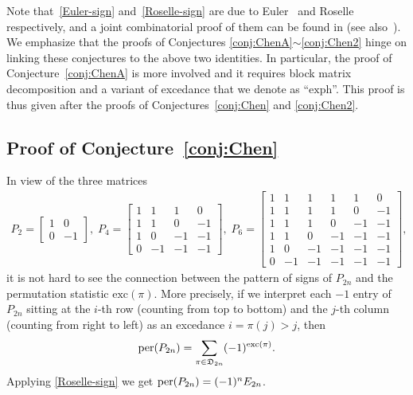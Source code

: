 \documentclass[11pt,reqno]{amsart}
\numberwithin{equation}{section}
\theoremstyle{plain}
\theoremstyle{definition}
\def\exc{\mathrm{exc}}
\def\per{\mathrm{per}}
\def\exph{\mathrm{exph}}
\newcommand{\D}{\mathfrak{D}}
\def\per{{\rm per}}
\begin{document}
Note that~\eqref{Euler-sign} and~\eqref{Roselle-sign} are due to Euler~\cite{Eul} and Roselle~\cite{Ros} respectively, and a joint combinatorial proof of them can be found in \cite[Chap.~5]{FS} (see also~\cite{LZ}). We emphasize that the proofs of Conjectures \ref{conj:ChenA}\texorpdfstring{$\sim$}{}\ref{conj:Chen2} hinge on linking these conjectures to the above two identities. In particular, the proof of Conjecture~\ref{conj:ChenA} is more involved and it requires block matrix decomposition and a variant of excedance that we denote as ``$\exph$''. This proof is thus given after the proofs of Conjectures~\ref{conj:Chen} and \ref{conj:Chen2}.

\subsection{Proof of Conjecture~\ref{conj:Chen}}

In view of the three matrices
\begin{align*}
P_2=\begin{bmatrix}
1 & 0 \\
0 & -1
\end{bmatrix},
\;
P_4=\begin{bmatrix}
1 & 1 & 1 & 0\\
1 & 1 & 0 & -1\\
1 & 0 & -1 & -1\\
0 & -1 & -1 & -1
\end{bmatrix},
\;
P_6=\begin{bmatrix}
1 & 1 & 1 & 1 & 1 & 0\\
1 & 1 & 1 & 1 & 0 & -1\\
1 & 1 & 1 & 0 & -1 & -1\\
1 & 1 & 0 & -1 & -1 & -1\\
1 & 0 & -1 & -1 & -1 & -1\\
0 & -1 & -1 & -1 & -1 & -1
\end{bmatrix},
\end{align*}
it is not hard to see the connection between the pattern of signs of $P_{2n}$ and the permutation statistic $\exc(\pi)$. More precisely, if we interpret each $-1$ entry of $P_{2n}$ sitting at the $i$-th row (counting from top to bottom) and the $j$-th column (counting from right to left) as an excedance $i=\pi(j)>j$, then
\begin{equation}\label{eq:signder}
\per(P_{2n})=\sum_{\pi\in\D_{2n}}(-1)^{\exc(\pi)}.
\end{equation}
Applying \eqref{Roselle-sign} we get $\per(P_{2n})=(-1)^nE_{2n}$.
\end{document}
